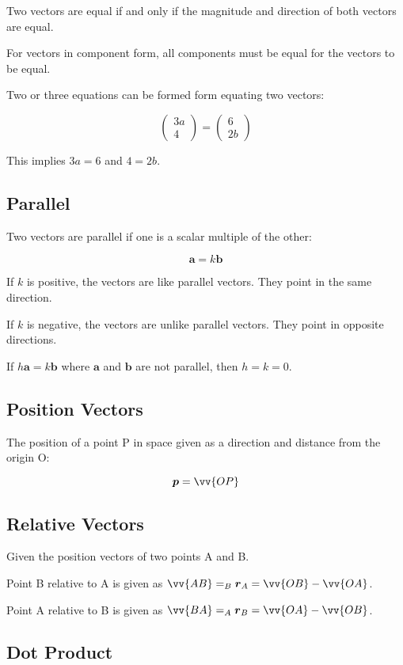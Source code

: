 \documentclass[a4paper,11pt]{report}
\newcommand{\bb}{\boldsymbol}
\begin{document}
Two vectors are equal if and only if the magnitude and direction of both vectors
are equal.

For vectors in component form, all components must be equal for the vectors to
be equal.

Two or three equations can be formed form equating two vectors:

$$
\begin{pmatrix} 3a \\ 4 \end{pmatrix} = \begin{pmatrix} 6 \\ 2b \end{pmatrix}
$$

This implies $3a = 6$ and $4 = 2b$.

\subsection{Parallel}

Two vectors are parallel if one is a scalar multiple of the other:

$$
\bb{a} = k \bb{b}
$$

If $k$ is positive, the vectors are like parallel vectors. They point in the
same direction.

If $k$ is negative, the vectors are unlike parallel vectors. They point in
opposite directions.

If $h \bb{a} = k \bb{b}$ where $\bb{a}$ and $\bb{b}$ are not parallel, then
$h = k = 0$.

\subsection{Position Vectors}

The position of a point P in space given as a direction and distance from the
origin O:

$$
\bb{p} = \vv{OP}
$$

\subsection{Relative Vectors}

Given the position vectors of two points A and B.

Point B relative to A is given as $\vv{AB} = _B\bb{r}_A = \vv{OB} - \vv{OA}$.

Point A relative to B is given as $\vv{BA} = _A\bb{r}_B = \vv{OA} - \vv{OB}$.

\subsection{Dot Product}
\end{document}
